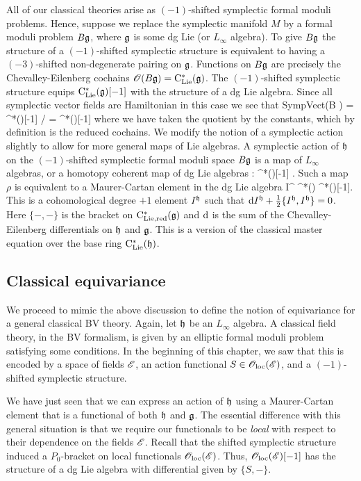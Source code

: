 \documentclass[10pt]{amsart}
\begin{document}
All of our classical theories arise as $(-1)$-shifted symplectic formal moduli problems.
Hence, suppose we replace the symplectic manifold $M$ by a formal moduli problem $B \mathfrak g$, where $\mathfrak g$ is some dg Lie (or $L_\infty$ algebra). 
To give $B \mathfrak g$ the structure of a $(-1)$-shifted symplectic structure is equivalent to having a $(-3)$-shifted non-degenerate pairing on $\mathfrak g$. 
Functions on $B\mathfrak g$ are precisely the Chevalley-Eilenberg cochains $\mathscr O(B\mathfrak g) = {\rm C}_{{\rm Lie}}^*(\mathfrak g)$. 
The $(-1)$-shifted symplectic structure equips ${\rm C}_{{\rm Lie}}^*(\mathfrak g) [-1]$ with the structure of a dg Lie algebra.
Since all symplectic vector fields are Hamiltonian in this case we see that 
\ben
{\rm SympVect}(B \fg) = \clie^*(\fg)[-1] / \CC = \cred^*(\fg)[-1]
\een
where we have taken the quotient by the constants, which by definition is the reduced cochains. 
We modify the notion of a symplectic action slightly to allow for more general maps of Lie algebras.
A symplectic action of $\mathfrak h$ on the $(-1)$-shifted symplectic formal moduli space $B \mathfrak g$ is a map of $L_\infty$ algebras, or a homotopy coherent map of dg Lie algebras
\ben
\rho : \fh \rightsquigarrow \cred^*(\fg)[-1] .
\een
Such a map $\rho$ is equivalent to a Maurer-Cartan element in the dg Lie algebra
\ben
I^{\fh} \in \clie^*(\fh) \tensor \cred^*(\fg)[-1].
\een
This is a cohomological degree $+1$ element $I^\mathfrak h$ such that ${\rm d} I^\mathfrak h + \frac{1}{2}\{I^\mathfrak h, I^\mathfrak h\} = 0$.
Here $\{-,-\}$ is the bracket on ${\rm C}_{\rm Lie, red}^*(\mathfrak g)$ and ${\rm d}$ is the sum of the Chevalley-Eilenberg differentials on $\mathfrak h$ and $\mathfrak g$. 
This is a version of the classical master equation over the base ring ${\rm C}_{{\rm Lie}}^*(\mathfrak h)$. 

\subsection{Classical equivariance}

We proceed to mimic the above discussion to define the notion of equivariance for a general classical BV theory. 
Again, let $\mathfrak h$ be an $L_\infty$ algebra.
A classical field theory, in the BV formalism, is given by an elliptic formal moduli problem satisfying some conditions. 
In the beginning of this chapter, we saw that this is encoded by a space of fields $\mathscr E$, an action functional $S \in {\mathscr O}_{\rm loc}(\mathscr E)$, and a $(-1)$-shifted symplectic structure. 

We have just seen that we can express an action of $\mathfrak h$ using a Maurer-Cartan element that is a functional of both $\mathfrak h$ and $\mathfrak g$.
The essential difference with this general situation is that we require our functionals to be {\em local} with respect to their dependence on the fields $\mathscr E$. 
Recall that the shifted symplectic structure induced a $P_0$-bracket on local functionals ${\mathscr O}_{\rm loc}(\mathscr E)$.
Thus, ${\mathscr O}_{\rm loc}(\mathscr E)[-1]$ has the structure of a dg Lie algebra with differential given by $\{S,-\}$. 
\end{document}
